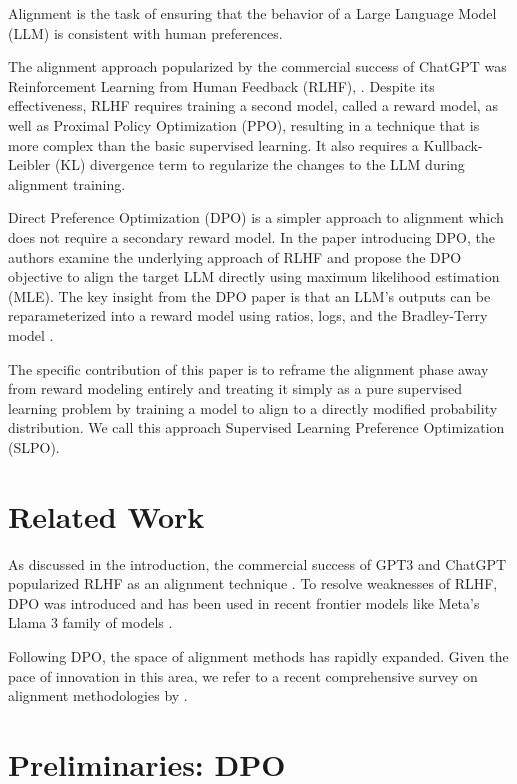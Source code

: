 \documentclass[twoside,11pt]{article}
\begin{document}
Alignment is the task of ensuring that the behavior of a
Large Language Model (LLM) is consistent 
with human preferences. 

The alignment approach popularized by the commercial success of ChatGPT was 
Reinforcement Learning from Human Feedback (RLHF), \citep{ouyang2022training}. 
Despite its effectiveness, RLHF requires training a second model, called
a reward model, as well as Proximal Policy Optimization (PPO), resulting in a 
technique that is more complex than the basic supervised learning. It also
requires a Kullback-Leibler (KL) divergence term to regularize the
changes to the LLM during alignment training.

Direct Preference Optimization (DPO) is a simpler approach to alignment
which does not require a secondary reward model. In the paper introducing
DPO, the authors examine the underlying
approach of RLHF and propose
the DPO objective to align the target LLM directly using
maximum likelihood estimation (MLE). 
The key insight from the DPO paper is that an LLM's
outputs can be reparameterized into a reward model using ratios, logs,
and the Bradley-Terry model \citep{bradley1952rank}.

The specific contribution of this paper is to reframe the alignment
phase away from reward modeling entirely and treating it simply as
a pure supervised learning problem by training a model to align to
a directly modified probability distribution. We call this
approach Supervised Learning Preference Optimization (SLPO).

\section{Related Work}

As discussed in the introduction,
the commercial success of GPT3 and ChatGPT popularized RLHF
as an 
alignment technique \citep{ouyang2022training}. To resolve
weaknesses of RLHF, DPO was introduced and has
been used in recent frontier models
like Meta's Llama 3 family of models \citep{Rafailov, llama}.

Following DPO, the space of alignment methods has rapidly expanded.
Given the pace of innovation in this area, 
we refer to a recent comprehensive survey on 
alignment methodologies by \cite{wang2024comprehensivesurveyllmalignment}.

\section{Preliminaries: DPO}
\end{document}
